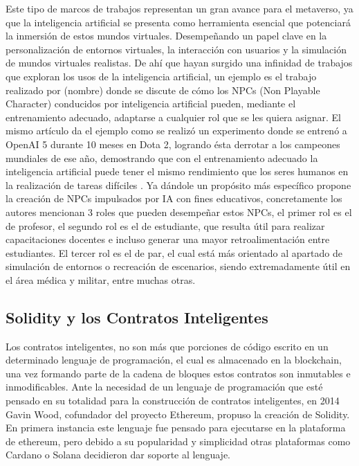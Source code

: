 \documentclass[a4paper,10pt]{article}
\begin{document}
	Este tipo de marcos de trabajos representan un gran avance para el metaverso, ya que la inteligencia artificial se presenta como herramienta esencial que potenciará la inmersión de estos mundos virtuales. Desempeñando un papel clave en la personalización de entornos virtuales, la interacción con usuarios y la simulación de mundos virtuales realistas. De ahí que hayan surgido una infinidad de trabajos que exploran los usos de la inteligencia artificial, un ejemplo es el trabajo realizado por (nombre) donde se discute de cómo los NPCs (Non Playable Character) conducidos por inteligencia artificial pueden, mediante el entrenamiento adecuado, adaptarse a cualquier rol que se les quiera asignar. El mismo artículo da el ejemplo como se realizó un experimento donde se entrenó a OpenAI 5 durante 10 meses en Dota 2, logrando ésta derrotar a los campeones mundiales de ese año, demostrando que con el entrenamiento adecuado la inteligencia artificial puede tener el mismo rendimiento que los seres humanos en la realización de tareas difíciles \textcite{yang2022fusing}. Ya dándole un propósito más específico \textcite{hwang2022definition} propone la creación de NPCs impulsados por IA con fines educativos, concretamente los autores mencionan 3 roles que pueden desempeñar estos NPCs, el primer rol es el de profesor, el segundo rol es el de estudiante, que resulta útil para realizar capacitaciones docentes e incluso generar una mayor retroalimentación entre estudiantes. El tercer rol es el de par, el cual está más orientado al apartado de simulación de entornos o recreación de escenarios, siendo extremadamente útil en el área médica y militar, entre muchas otras.
	
	\subsection{Solidity y los Contratos Inteligentes}
	\label{seccion2.2}
	Los contratos inteligentes, no son más que porciones de código escrito en un determinado lenguaje de programación, el cual es almacenado en la blockchain, una vez formando parte de la cadena de bloques estos contratos son inmutables e inmodificables. Ante la necesidad de un lenguaje de programación que esté pensado en su totalidad para la construcción de contratos inteligentes, en 2014 Gavin Wood, cofundador del proyecto Ethereum, propuso la creación de Solidity. En primera instancia este lenguaje fue pensado para ejecutarse en la plataforma de ethereum, pero debido a su popularidad y simplicidad otras plataformas como Cardano o Solana decidieron dar soporte al lenguaje.
	
\end{document}
